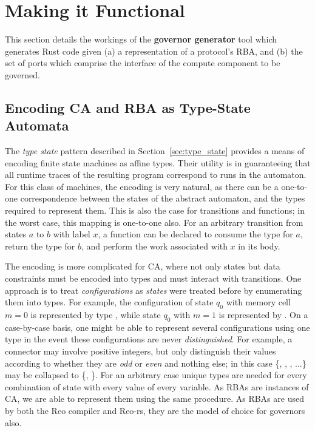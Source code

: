 
\section{Making it Functional}
\label{sec:making_it_functional}
This section details the workings of the \textbf{governor generator} tool which generates Rust code given (a) a representation of a protocol's RBA, and (b) the set of ports which comprise the interface of the compute component to be governed.

\subsection{Encoding CA and RBA as Type-State Automata}
\label{sec:type_space_automaton}
The \textit{type state} pattern described in Section~\ref{sec:type_state} provides a means of encoding finite state machines as affine types. Their utility is in guaranteeing that all runtime traces of the resulting program correspond to runs in the automaton. For this class of machines, the encoding is very natural, as there can be a one-to-one correspondence between the states of the abstract automaton, and the types required to represent them. This is also the case for transitions and functions; in the worst case, this mapping is one-to-one also. For an arbitrary transition from states $a$ to $b$ with label $x$, a function can be declared to consume the type for $a$, return the type for $b$, and perform the work associated with $x$ in its body.

The encoding is more complicated for CA, where not only states but data constraints must be encoded into types and must interact with transitions. One approach is to treat \textit{configurations} as \textit{states} were treated before by enumerating them into types. For example, the configuration of state $q_0$ with memory cell $m=0$ is represented by type , while state $q_0$ with $m=1$ is represented by . On a case-by-case basis, one might be able to represent several configurations using one type in the event these configurations are never \textit{distinguished}. For example, a connector may involve positive integers, but only distinguish their values according to whether they are \textit{odd} or \textit{even} and nothing else; in this case \{, , , ...\} may be collapsed to \{, \}. For an arbitrary case unique types are needed for every combination of state with every value of every variable. As RBAs are instances of CA, we are able to represent them using the same procedure. As RBAs are used by both the Reo compiler and Reo-rs, they are the model of choice for governors also. 

